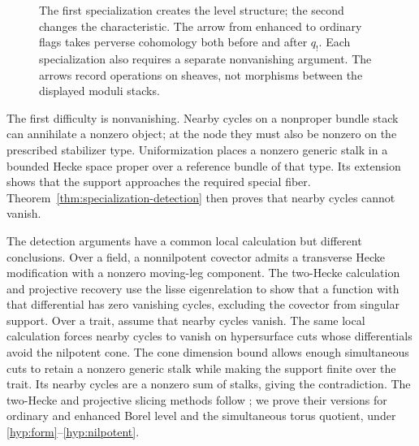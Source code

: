 \begin{figure}[htbp]
\centering
{}
\caption{The first specialization creates the level structure; the second
changes the characteristic. The arrow from enhanced to ordinary flags takes
perverse cohomology both before and after $q_!$. Each specialization also
requires a separate nonvanishing argument. The arrows record operations on
sheaves, not morphisms between the displayed moduli stacks.}
\label{fig:construction}
\end{figure}

The first difficulty is nonvanishing. Nearby cycles on a nonproper bundle
stack can annihilate a nonzero object; at the node they must also be
nonzero on the prescribed stabilizer type. Uniformization places a nonzero
generic stalk in a bounded Hecke space proper over a reference bundle of
that type. Its extension shows that the support approaches the required
special fiber. Theorem~\ref{thm:specialization-detection} then proves that
nearby cycles cannot vanish.

The detection arguments have a common local calculation but different
conclusions. Over a field, a nonnilpotent covector admits a transverse
Hecke modification with a nonzero moving-leg component. The two-Hecke
calculation and projective recovery use the lisse eigenrelation to show
that a function with that differential has zero vanishing cycles, excluding
the covector from singular support. Over a trait, assume that nearby cycles
vanish. The same local calculation forces nearby cycles to vanish on
hypersurface cuts whose differentials avoid the nilpotent cone. The cone
dimension bound allows enough simultaneous cuts to retain a nonzero generic
stalk while making the support finite over the trait. Its nearby cycles
are a nonzero sum of stalks, giving the contradiction. The two-Hecke and
projective slicing methods follow
\cite[Sections~3--7]{OpenAIFullSupport2026}; we prove their versions for
ordinary and enhanced Borel level and the simultaneous torus quotient,
under \ref{hyp:form}--\ref{hyp:nilpotent}.

